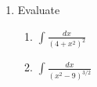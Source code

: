 \documentclass[11pt,fleqn]{article}
\begin{document}
\begin{enumerate}
\item Evaluate 
	\begin{enumerate}
	\item $\displaystyle{\int \frac{dx}{(4+x^2)^2} \:  }$
	\vfill
	\item $\displaystyle{\int \frac{dx}{(x^2-9)^{3/2}}}$
	\vfill
	\end{enumerate}
	


\end{enumerate}
\end{document}

